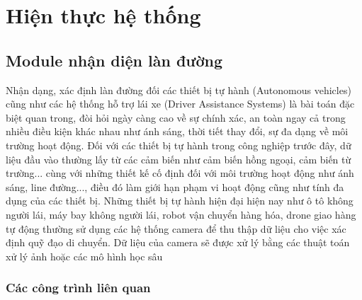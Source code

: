 \chapter{Hiện thực hệ thống}
\section{Module nhận diện làn đường}
Nhận dạng, xác định làn đường đối các thiết bị tự hành (Autonomous vehicles) cũng như các hệ thống hỗ trợ lái xe (Driver Assistance Systems) là bài toán đặc biệt quan trong, đòi hỏi ngày càng cao về sự chính xác, an toàn ngay cả trong nhiều điều kiện khác nhau như ánh sáng, thời tiết thay đổi, sự đa dạng về môi trường hoạt động. Đối với các thiết
bị tự hành trong công nghiệp trước đây, dữ liệu đầu vào thường lấy từ các cảm biến như cảm biến hồng ngoại, cảm biến từ trường... cùng với những thiết kế cố định đối với môi trường hoạt động như ánh sáng, line đường..., điều đó làm giới hạn phạm vi hoạt động cũng như tính đa dụng của các thiết bị. Những thiết bị tự hành hiện đại hiện nay như ô tô không người lái, máy bay không người lái, robot vận chuyển hàng hóa, drone giao
hàng tự động thường sử dụng các hệ thống camera để thu thập dữ liệu cho việc xác định quỹ đạo di chuyển. Dữ liệu của camera sẽ được xử lý bằng các thuật toán xử lý ảnh hoặc các mô hình học sâu
\subsection{Các công trình liên quan}
